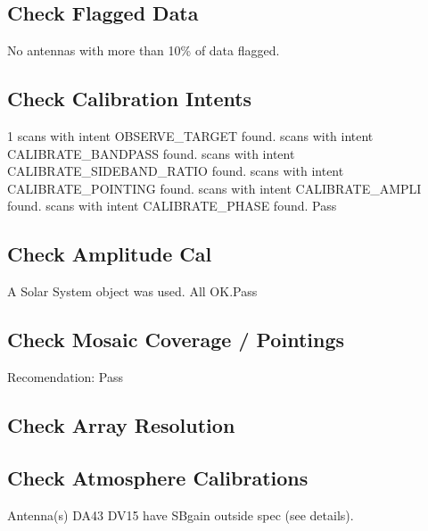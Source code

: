 \documentclass[10pt,]{article}
\begin{document}
\subsection{Check Flagged Data}\label{check-flagged-data}

No antennas with more than 10\% of data flagged.

\subsection{Check Calibration Intents}\label{check-calibration-intents}

1 scans with intent OBSERVE\_TARGET found. scans with intent CALIBRATE\_BANDPASS found. scans with intent CALIBRATE\_SIDEBAND\_RATIO found. scans with intent CALIBRATE\_POINTING found. scans with intent CALIBRATE\_AMPLI found. scans with intent CALIBRATE\_PHASE found.\newline 
Pass

\subsection{Check Amplitude Cal}\label{check-amplitude-cal}

A Solar System object was used. All OK.Pass

\subsection{Check Mosaic Coverage /
Pointings}\label{check-mosaic-coverage-pointings}

Recomendation: \newline 
Pass

\subsection{Check Array Resolution}\label{check-array-resolution}

\subsection{Check Atmosphere
Calibrations}\label{check-atmosphere-calibrations}

Antenna(s) DA43 DV15 have SBgain outside spec (see details).
\end{document}
